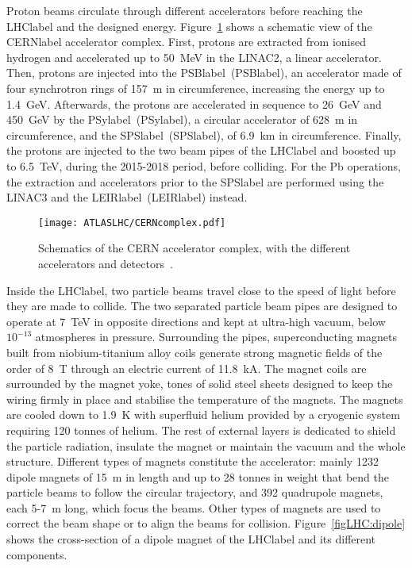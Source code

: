 Proton beams circulate through different accelerators before reaching the \acrshort{LHClabel} and the designed energy. Figure~\ref{figLHC:CERNcomplex} shows a schematic view of the \acrshort{CERNlabel} accelerator complex. First, protons are extracted from ionised hydrogen and accelerated up to 50~MeV in the LINAC2, a linear accelerator. Then, protons are injected into the \acrlong{PSBlabel}~(\acrshort{PSBlabel}), an accelerator made of four synchrotron rings of 157~m in circumference, increasing the energy up to 1.4~GeV. Afterwards, the protons are accelerated in sequence to 26~GeV and 450~GeV by the \acrlong{PSylabel}~(\acrshort{PSylabel}), a circular accelerator of 628~m in circumference, and the \acrlong{SPSlabel}~(\acrshort{SPSlabel}), of 6.9~km in circumference. Finally, the protons are injected to the two beam pipes of the \acrshort{LHClabel} and boosted up to 6.5~TeV, during the 2015-2018 period, before colliding. For the Pb operations, the extraction and accelerators prior to the \acrshort{SPSlabel} are performed using the LINAC3 and the \acrlong{LEIRlabel}~(\acrshort{LEIRlabel}) instead.\\

\begin{figure}[htbp]
    \RawFloats
    \begin{center}
    \texttt{[image: ATLASLHC/CERNcomplex.pdf]}
    \caption{
        Schematics of the CERN accelerator complex, with the different accelerators and detectors~\cite{CERNcomplex}. 
    }
    \label{figLHC:CERNcomplex}
    \end{center}
\end{figure}

Inside the \acrshort{LHClabel}, two particle beams travel close to the speed of light before they are made to collide. The two separated particle beam pipes are designed to operate at 7~TeV in opposite directions and kept at ultra-high vacuum, below $10^{-13}$ atmospheres in pressure. Surrounding the pipes, superconducting magnets built from niobium-titanium alloy coils generate strong magnetic fields of the order of 8~T through an electric current of 11.8~kA. The magnet coils are surrounded by the magnet yoke, tones of solid steel sheets designed to keep the wiring firmly in place and stabilise the temperature of the magnets. The magnets are cooled down to 1.9~K with superfluid helium provided by a cryogenic system requiring 120 tonnes of helium. The rest of external layers is dedicated to shield the particle radiation, insulate the magnet or maintain the vacuum and the whole structure. Different types of magnets constitute the accelerator: mainly 1232 dipole magnets of 15~m in length and up to 28 tonnes in weight that bend the particle beams to follow the circular trajectory, and 392 quadrupole magnets, each 5-7~m long, which focus the beams. Other types of magnets are used to correct the beam shape or to align the beams for collision. Figure~\ref{figLHC:dipole} shows the cross-section of a dipole magnet of the \acrshort{LHClabel} and its different components.\\

